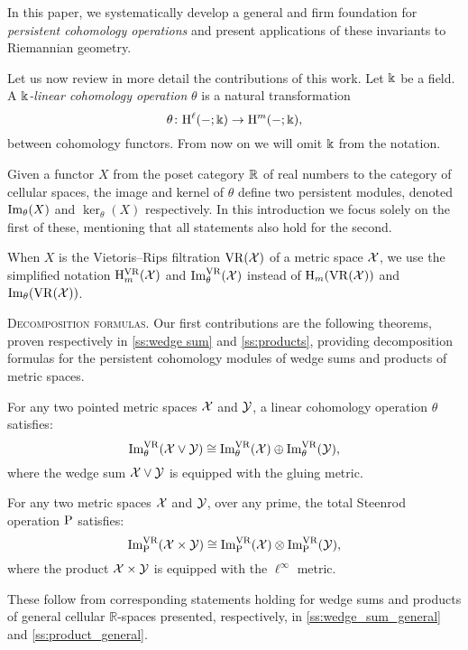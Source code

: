 In this paper, we systematically develop a general and firm foundation for \textit{persistent cohomology operations} and present applications of these invariants to Riemannian geometry.

\medskip Let us now review in more detail the contributions of this work.
Let \(\Bbbk\) be a field.
A \textit{\(\Bbbk\)-linear cohomology operation} \(\theta\) is a natural transformation
\[
\theta \colon \mathrm{H}^\ell(-;\Bbbk) \to \mathrm{H}^m(-;\Bbbk),
\]
between cohomology functors.
From now on we will omit \(\Bbbk\) from the notation.

Given a functor \(X\) from the poset category $\mathbb{R}$ of real numbers to the category of cellular spaces, the image and kernel of \(\theta\) define two persistent modules, denoted \(\operatorname{Im}_\theta(X)\) and \(\ker_\theta(X)\) respectively.
In this introduction we focus solely on the first of these, mentioning that all statements also hold for the second.

When \(X\) is the Vietoris--Rips filtration \(\mathrm{VR}(\mathcal{X})\) of a metric space \(\mathcal{X}\), we use the simplified notation \(\mathrm{H}_m^{\mathrm{VR}}(\mathcal{X})\) and \(\operatorname{Im}_\theta^{\mathrm{VR}}(\mathcal{X})\) instead of \(\mathrm{H}_m(\mathrm{VR}(\mathcal{X}))\) and \(\operatorname{Im}_\theta(\mathrm{VR}(\mathcal{X}))\).

\medskip\noindent\textsc{Decomposition formulas.}
Our first contributions are the following theorems, proven respectively in \cref{ss:wedge sum} and \cref{ss:products}, providing decomposition formulas for the persistent cohomology modules of wedge sums and products of metric spaces.

\begin{introtheorem}\label{thm:decomposition1}
	For any two pointed metric spaces $\mathcal{X}$ and $\mathcal{Y}$, a linear cohomology operation \(\theta\) satisfies:
	\[
	\operatorname{Im}_\theta^{\mathrm{VR}}(\mathcal{X} \vee \mathcal{Y}) \cong \operatorname{Im}_\theta^{\mathrm{VR}}(\mathcal{X}) \oplus \operatorname{Im}_\theta^{\mathrm{VR}}(\mathcal{Y}),
	\]
	where the wedge sum \(\mathcal{X} \vee \mathcal{Y}\) is equipped with the gluing metric.
\end{introtheorem}

\begin{introtheorem}\label{thm:decomposition2}
	For any two metric spaces $\mathcal{X}$ and $\mathcal{Y}$, over any prime, the total Steenrod operation \(\mathrm{P}\) satisfies:
	\[
	\operatorname{Im}^{\mathrm{VR}}_{\mathrm{P}}(\mathcal{X} \times \mathcal{Y}) \cong \operatorname{Im}^{\mathrm{VR}}_{\mathrm{P}}(\mathcal{X}) \otimes \operatorname{Im}^{\mathrm{VR}}_{\mathrm{P}}(\mathcal{Y}),
	\]
	where the product \(\mathcal{X} \times \mathcal{Y}\) is equipped with the \(\ell^\infty\) metric.
\end{introtheorem}

These follow from corresponding statements holding for wedge sums and products of general cellular $\mathbb{R}$-spaces presented, respectively, in \cref{ss:wedge_sum_general} and \cref{ss:product_general}.

